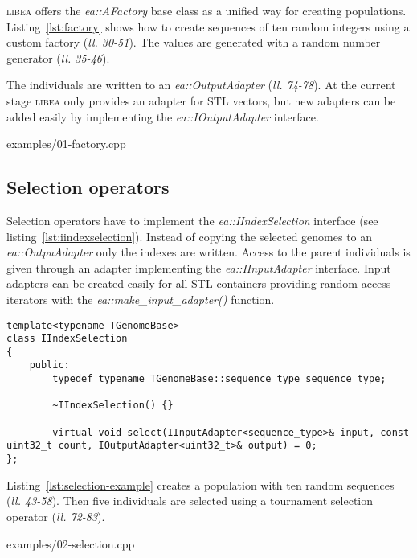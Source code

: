 \documentclass[a4paper]{article}
\begin{document}
\textsc{libea} offers the \textit{ea::AFactory} base class as a unified way for creating populations. Listing~\ref{lst:factory} shows how to create sequences of ten random integers using a custom factory (\textit{ll. 30-51}). The values are generated with a random number generator (\textit{ll. 35-46}).

The individuals are written to an \textit{ea::OutputAdapter} (\textit{ll. 74-78}). At the current stage \textsc{libea} only provides an adapter for STL vectors, but new adapters can be added easily by implementing the \textit{ea::IOutputAdapter} interface.

\begin{lstinputlisting}[caption=custom factory,label=lst:factory]{examples/01-factory.cpp}
\end{lstinputlisting}

\subsection{Selection operators}

Selection operators have to implement the \textit{ea::IIndexSelection} interface (see listing~\ref{lst:iindexselection}). Instead of copying the selected genomes to an \textit{ea::OutpuAdapter} only the indexes are written. Access to the parent individuals is given through an adapter implementing the \textit{ea::IInputAdapter} interface. Input adapters can be created easily for all STL containers providing random access iterators with the \textit{ea::make\_input\_adapter()} function.

\begin{lstlisting}[caption=IIndexSelection,label=lst:iindexselection]
template<typename TGenomeBase>
class IIndexSelection
{
	public:
		typedef typename TGenomeBase::sequence_type sequence_type;

		~IIndexSelection() {}

		virtual void select(IInputAdapter<sequence_type>& input, const uint32_t count, IOutputAdapter<uint32_t>& output) = 0;
};
\end{lstlisting}

Listing~\ref{lst:selection-example} creates a population with ten random sequences  (\textit{ll. 43-58}). Then five individuals are selected using a tournament selection operator (\textit{ll. 72-83}).

\begin{lstinputlisting}[caption=selection operators,label=lst:selection-example]{examples/02-selection.cpp}
\end{lstinputlisting}
\end{document}
